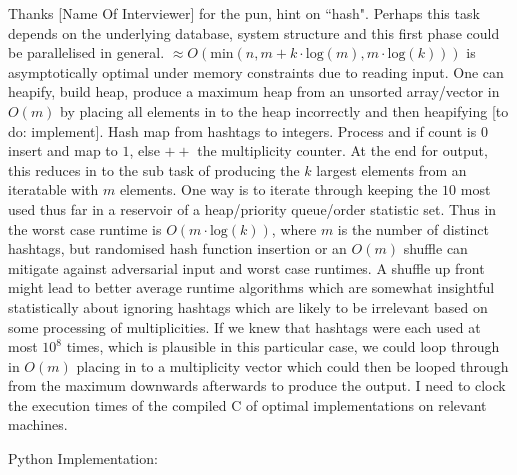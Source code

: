 Thanks [Name Of Interviewer] for the pun, hint on ``hash". Perhaps this task depends on the underlying database, system structure and this first phase could be parallelised in general. $\approx O(\text{min}(n,m+k \cdot \text{log}(m),m \cdot \text{log}(k)))$ is asymptotically optimal under memory constraints due to reading input. One can heapify, build heap, produce a maximum heap from an unsorted array/vector in $O(m)$ by placing all elements in to the heap incorrectly and then heapifying [to do: implement]. Hash map from hashtags to integers. Process and if count is $0$ insert and map to $1$, else $++$ the multiplicity counter. At the end for output, this reduces in to the sub task of producing the $k$ largest elements from an iteratable with $m$ elements. One way is to iterate through keeping the $10$ most used thus far in a reservoir of a heap/priority queue/order statistic set. Thus in the worst case runtime is $O(m \cdot \text{log}(k))$, where $m$ is the number of distinct hashtags, but randomised hash function insertion or an $O(m)$ shuffle can mitigate against adversarial input and worst case runtimes. A shuffle up front might lead to better average runtime algorithms which are somewhat insightful statistically about ignoring hashtags which are likely to be irrelevant based on some processing of multiplicities. If we knew that hashtags were each used at most $10^8$ times, which is plausible in this particular case, we could loop through in $O(m)$ placing in to a multiplicity vector which could then be looped through from the maximum downwards afterwards to produce the output. I need to clock the execution times of the compiled C of optimal implementations on relevant machines.

Python Implementation:

